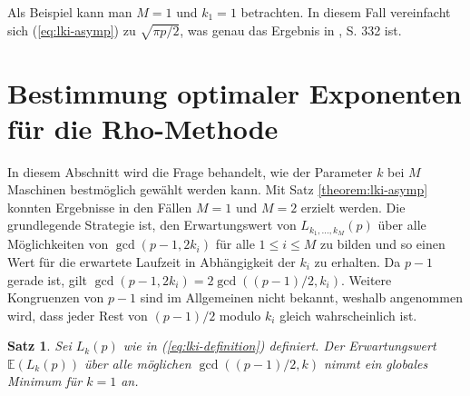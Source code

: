 \documentclass[a4paper, 11pt, ngerman]{article}
\newcommand{\E}{\mathbb{E}}
\theoremstyle{definition}
\theoremstyle{plain}
\newtheorem{theorem}{Satz}
\theoremstyle{remark}
\begin{document}
Als Beispiel kann man $M = 1$ und $k_1 = 1$ betrachten. In diesem Fall vereinfacht sich (\ref{eq:lki-asymp}) zu $\sqrt{\pi p / 2}$, was genau das Ergebnis in \cite{pol75}, S. 332 ist.

\section{Bestimmung optimaler Exponenten für die Rho-Methode}
\label{sec:optimal-k}

In diesem Abschnitt wird die Frage behandelt, wie der Parameter $k$ bei $M$ Maschinen bestmöglich gewählt werden kann. Mit Satz \ref{theorem:lki-asymp} konnten Ergebnisse in den Fällen $M = 1$ und $M = 2$ erzielt werden. Die grundlegende Strategie ist, den Erwartungswert von $L_{k_1, \dots, k_M}(p)$ über alle Möglichkeiten von $\gcd(p - 1, 2k_i)$ für alle $1 \le i \le M$ zu bilden und so einen Wert für die erwartete Laufzeit in Abhängigkeit der $k_i$ zu erhalten. Da $p - 1$ gerade ist, gilt $\gcd(p-1, 2k_i) = 2\gcd((p - 1)/2, k_i)$. Weitere Kongruenzen von $p - 1$ sind im Allgemeinen nicht bekannt, weshalb angenommen wird, dass jeder Rest von $(p- 1)/2$ modulo $k_i$ gleich wahrscheinlich ist.

\begin{theorem}
    \label{theorem:optimal-k-m1}
    Sei $L_k(p)$ wie in (\ref{eq:lki-definition}) definiert. Der Erwartungswert $\E(L_k(p))$ über alle möglichen $\gcd((p - 1)/2, k)$ nimmt ein globales Minimum für $k = 1$ an.
\end{theorem}
\end{document}
